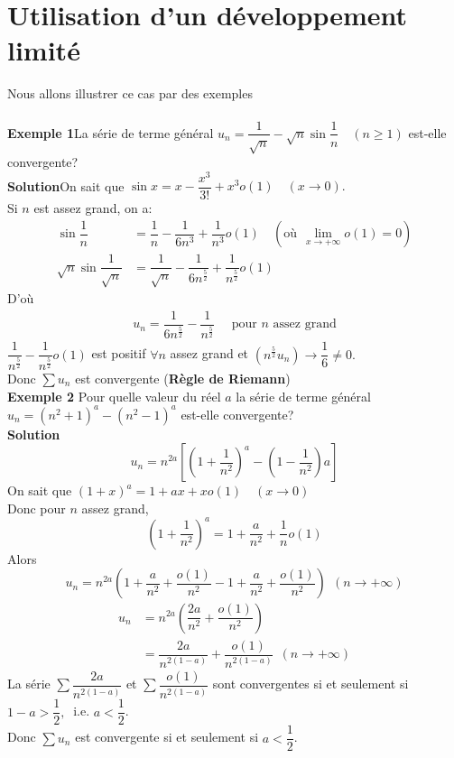 \documentclass[11pt, a4paper]{book}
\begin{document}
\section{Utilisation d'un d\'eveloppement limit\'e}
Nous allons illustrer ce cas par des exemples\\ \\
\textbf{Exemple 1}\quad La s\'erie de terme g\'en\'eral $u_n=\dfrac{1}{\sqrt{n}}-\sqrt{n}\sin \dfrac{1}{n}\quad(n \geq 1)$ est-elle convergente?\\
\textbf{Solution}\quad On sait que $\sin x=x-\dfrac{x^3}{3!}+x^3 o(1) \quad(x\rightarrow0).$ \\
Si $n$ est assez grand, on a:
\begin{align*}  \sin \dfrac{1}{n}&=\dfrac{1}{n}-\dfrac{1}{6n^3}+\dfrac{1}{n^3} o(1)\quad( \text{o\`u}
~~\lim_{x\rightarrow+\infty} o(1)=0)\\
\sqrt{n}\sin\dfrac{1}{\sqrt{n}}&=
\dfrac{1}{\sqrt{n}}-\dfrac{1}{6n^{\frac{5}{2}}}+\dfrac{1}{n^{\frac{5}{2}}} o(1)
\end{align*}
D'o\`u \\
\begin{align*} u_n=\dfrac{1}{6n^{\frac{5}{2}}}-\dfrac{1}{n^{\frac{5}{2}}}\quad\text{ pour $n$ assez grand} \end{align*}
$\dfrac{1}{n^{\frac{5}{2}}}-\dfrac{1}{n^{\frac{5}{2}}}o(1)$ est positif $\forall n$ assez grand et $ (n^{\frac{5}{2}}u_n)\rightarrow \dfrac{1}{6} \neq 0.$ \\Donc $\sum u_n$ est convergente (\textbf{R\`egle de Riemann})\\
\textbf{Exemple 2} \quad
Pour quelle valeur du r\'eel $a$ la s\'erie de terme g\'en\'eral $u_n=(n^2+1)^a-(n^2-1)^a$ est-elle convergente?\\
\textbf{Solution} $$u_n=n^{2a}\left[ \left(1+\dfrac{1}{n^2}\right)^a-\left(1-\dfrac{1}{n^2}\right)a\right]$$
On sait que $(1+x)^a=1+ax+x o(1)\quad(x\rightarrow0)$\\ Donc pour $n$ assez grand, $$\left(1+\dfrac{1}{n^2}\right)^a=1+\dfrac{a}{n^{2}}+\dfrac{1}{n}o(1)$$
Alors $$ u_n=n^{2a}\left( 1+\dfrac{a}{n^2}+\dfrac{o(1)}{n^2} -1+\dfrac{a}{n^2}+\dfrac{o(1)}{n^2}\right) ~~(n\rightarrow+\infty)$$ \begin{align*} u_n&=n^{2a}\left(\dfrac{2a}{n^2}+\dfrac{o(1)}{n^2}\right)\\ &=\dfrac{2a}{n^{2(1-a)}}+\dfrac{o(1)}{n^{2(1-a)}}~~(n\rightarrow+\infty) \end{align*}
La s\'erie $\sum \dfrac{2a}{n^{2(1-a)}}$ et $\sum \dfrac{o(1)}{n^{2(1-a)}}$ sont convergentes si et seulement si $1-a>\dfrac{1}{2},~$ i.e. $a<\dfrac{1}{2}$. \\ Donc $\sum u_n$ est convergente si et seulement si $a<\dfrac{1}{2}$.\\
\end{document}
